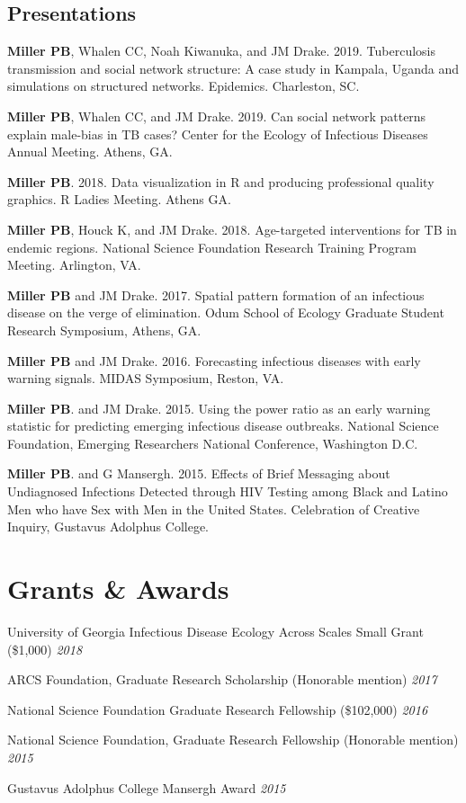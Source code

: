 \documentclass[letterpaper]{article}
\renewenvironment{itemize}{
  \begin{list}{}{
    \setlength{\leftmargin}{1.5em}
  }
}{
  \end{list}
}
\begin{document}
\subsection*{Presentations}
\begin{itemize}
\item  \textbf{Miller PB}, Whalen CC, Noah Kiwanuka, and JM Drake. 2019. Tuberculosis transmission and social network structure: A case study in Kampala, Uganda and simulations on structured networks. Epidemics. Charleston, SC. 
\item  \textbf{Miller PB}, Whalen CC, and JM Drake. 2019. Can social network patterns explain male-bias in TB cases? Center for the Ecology of Infectious Diseases Annual Meeting. Athens, GA.
\item \textbf{Miller PB}. 2018. Data visualization in R and producing professional quality graphics. R Ladies Meeting. Athens GA. 
\item   \textbf{Miller PB}, Houck K, and JM Drake. 2018. Age-targeted interventions for TB in endemic regions. National Science Foundation Research Training Program Meeting. Arlington, VA. 
\item  \textbf{Miller PB} and JM Drake. 2017. Spatial pattern formation of an infectious disease on the verge of elimination. Odum School of Ecology Graduate Student Research Symposium, Athens, GA. 
\item \textbf{Miller PB} and JM Drake. 2016. Forecasting infectious diseases with early warning signals. MIDAS Symposium, Reston, VA. 
\item \textbf{Miller PB}. and JM Drake. 2015. Using the power ratio as an early warning statistic for predicting emerging infectious disease outbreaks. National Science Foundation, Emerging Researchers National Conference, Washington D.C.
\item \textbf{Miller PB}. and G Mansergh. 2015. Effects of Brief Messaging about Undiagnosed Infections Detected through HIV Testing among Black and Latino Men who have Sex with Men in the United States. Celebration of Creative Inquiry, Gustavus Adolphus College.
\end{itemize}

\section*{Grants \& Awards}
\begin{itemize}
\item University of Georgia Infectious Disease Ecology Across Scales Small Grant (\$1,000) \hfill \textit{2018} 
\item ARCS Foundation, Graduate Research Scholarship (Honorable mention) \hfill \textit{2017} 
\item National Science Foundation Graduate Research Fellowship (\$102,000) \hfill \textit{2016} 
\item National Science Foundation, Graduate Research Fellowship (Honorable mention) \hfill \textit{2015} 
\item Gustavus Adolphus College Mansergh Award \hfill \textit{2015} 
\end{itemize}
\end{document}
